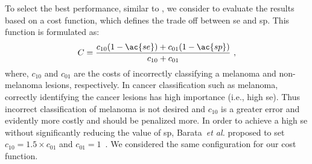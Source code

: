 To select the best performance, similar to \cite{barata2013towards}, we consider to evaluate the results based on a cost function, which defines the trade off between \ac{se} and \ac{sp}.
This function is formulated as:
\begin{equation}\label{eq:cost}
C = \frac{c_{10}(1-\ac{se})+c_{01}(1-\ac{sp})}{c_{10}+c_{01}} \ ,
\end{equation}
\noindent where, $c_{10}$ and $c_{01}$ are the costs of incorrectly classifying a melanoma and non-melanoma lesions, respectively.
In cancer classification such as melanoma, correctly identifying the cancer lesions has high importance (i.e., high \ac{se}). 
Thus incorrect classification of melanoma is not desired and $c_{10}$ is a greater error and evidently more costly and should be penalized more. 
In order to achieve a high \ac{se} without significantly reducing the value of \ac{sp}, Barata~\emph{et al.} proposed to set $c_{10} = 1.5 \times c_{01}$ and $c_{01} = 1$~\cite{barata2013towards}.  
We considered the same configuration for our cost function. 

